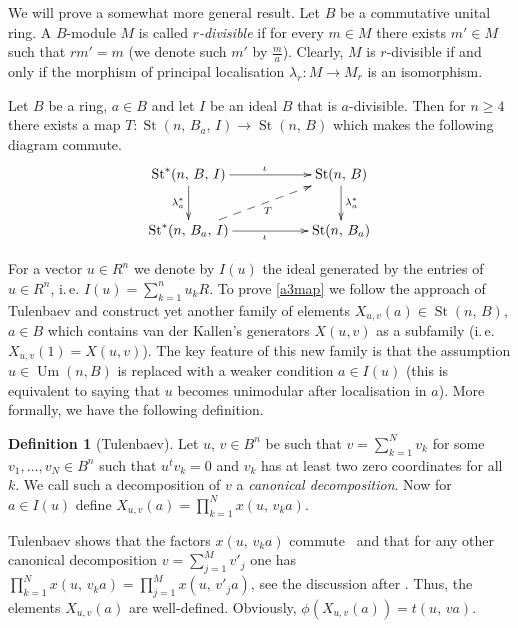 \documentclass[11pt]{amsart}
\theoremstyle{plain} \declaretheorem[name=Theorem, Refname={Theorem,Theorems}]{tm} \Crefname{tm}{Theorem}{Theorems}
\numberwithin{equation}{section}
\theoremstyle{definition} \newtheorem{df}[lm]{Definition} \Crefname{df}{Definition}{Definitions}
\theoremstyle{remark} \newtheorem{rk}[lm]{Remark} \Crefname{rk}{Remark}{Remarks}
\newcommand{\E}{{\mathrm{E}}}
\newcommand{\Um}{\mathop{\mathrm{Um}}\nolimits}
\newcommand{\St}{\mathop{\mathrm{St}}\nolimits}
\begin{document}
We will prove a somewhat more general result. Let $B$ be a commutative unital ring.
A $B$-module $M$ is called \emph{$r$-divisible} if for every $m\in M$ there exists $m'\in M$ such that $rm' = m$ (we denote such $m'$ by $\frac{m}{a}$).
Clearly, $M$ is $r$-divisible if and only if the morphism of principal localisation $\lambda_r\colon M \to M_r$ is an isomorphism.

\begin{tm} \label{a3map} Let $B$ be a ring, $a\in B$ and let $I$ be an ideal $B$ that is $a$-divisible.
Then for $n\geq 4$ there exists a map $T\colon\St(n,\,B_a,\,I)\rightarrow\St(n,\,B)$ which makes the following diagram commute.
$$\xymatrix{ \St^*(n,\,B,\,I)\ar@<-0.0ex>[rr]^{\iota}\ar@<-0.0ex>[d]_{\lambda_{a}^*} && \St(n,\,B)\ar@<-0.0ex>[d]^{\lambda_{a}^*}\\
             \St^*(n,\,B_a,\,I)\ar@<-0.0ex>[rr]_{\iota}\ar@{-->}[rru]_{T}            && \St(n,\,B_a)}$$ \end{tm}

For a vector $u\in R^n$ we denote by $I(u)$ the ideal generated by the entries of $u\in R^n$, i.\,e. $I(u)=\sum\limits_{k=1}^nu_kR$.
To prove \cref{a3map} we follow the approach of Tulenbaev and construct yet another family of elements $X_{u,v}(a)\in \St(n,\,B)$, $a\in B$ which contains van der Kallen's generators $X(u, v)$ as a subfamily (i.\,e. $X_{u,v}(1) = X(u, v)$).
The key feature of this new family is that the assumption $u \in\Um(n, B)$ is replaced with a weaker condition $a \in I(u)$ (this is equivalent to saying that $u$ becomes unimodular after localisation in $a$).
More formally, we have the following definition.

\begin{df}[Tulenbaev]
Let $u$, $v\in B^n$ be such that $v=\sum_{k=1}^Nv_k$ for some $v_1,\ldots,v_N\in B^n$ such that $u^tv_k=0$ and $v_k$ has at least two zero coordinates for all $k$.
We call such a decomposition of $v$ a \emph{canonical decomposition}.
Now for $a\in I(u)$ define $X_{u,v}(a) = \prod\limits_{k=1}^Nx(u,\,v_ka)$. 
\end{df}
Tulenbaev shows that the factors $x(u,\,v_ka)$ commute~\cite[Lemma~1.1\,e)]{Tul} and that for any other canonical decomposition $v=\sum_{j=1}^Mv'_j$ one has
$\prod_{k=1}^Nx(u,\,v_ka)=\prod_{j=1}^Mx(u,\,v'_ja)$, see the discussion after \cite[Lemma~1.1]{Tul}.
Thus, the elements $X_{u,v}(a)$ are well-defined. Obviously, $\phi(X_{u,v}(a))=t(u,\,va)$.
\end{document}
